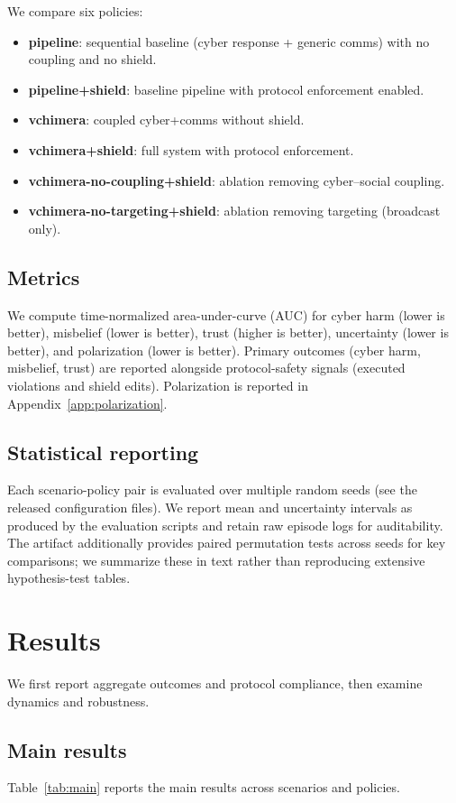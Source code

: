 \documentclass[sn-basic]{sn-jnl}
\begin{document}
We compare six policies:
\begin{itemize}[leftmargin=*]
  \item \textbf{pipeline}: sequential baseline (cyber response + generic comms) with no coupling and no shield.
  \item \textbf{pipeline+shield}: baseline pipeline with protocol enforcement enabled.
  \item \textbf{vchimera}: coupled cyber+comms without shield.
  \item \textbf{vchimera+shield}: full system with protocol enforcement.
  \item \textbf{vchimera-no-coupling+shield}: ablation removing cyber--social coupling.
  \item \textbf{vchimera-no-targeting+shield}: ablation removing targeting (broadcast only).
\end{itemize}

\subsection{Metrics}
We compute time-normalized area-under-curve (AUC) for cyber harm (lower is better), misbelief (lower is better), trust (higher is better), uncertainty (lower is better), and polarization (lower is better). Primary outcomes (cyber harm, misbelief, trust) are reported alongside protocol-safety signals (executed violations and shield edits). Polarization is reported in Appendix~\ref{app:polarization}.

\subsection{Statistical reporting}
Each scenario-policy pair is evaluated over multiple random seeds (see the released configuration files). We report mean and uncertainty intervals as produced by the evaluation scripts and retain raw episode logs for auditability. The artifact additionally provides paired permutation tests across seeds for key comparisons; we summarize these in text rather than reproducing extensive hypothesis-test tables.

\section{Results}
We first report aggregate outcomes and protocol compliance, then examine dynamics and robustness.

\subsection{Main results}
Table~\ref{tab:main} reports the main results across scenarios and policies.
\end{document}
